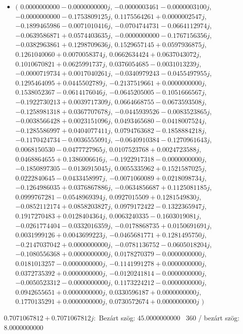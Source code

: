 \documentclass[14pt,a4paper]{article}
\begin{document}
\begin{itemize}
\item
$\big($
$0.0000000000-0.0000000000j$, $-0.0000003461-0.0000003100j$, $-0.0000000000-0.1753809125j$, $0.1175564261+0.0000002547j$, $-0.1899465986-0.0071010416j$, $-0.0704744731-0.0664112974j$, $-0.0639586871+0.0574403635j$, $-0.0000000000-0.1767156356j$, $-0.0382963861+0.1298709636j$, $0.1529657145+0.0597936875j$, $0.1261040060+0.0070058374j$, $0.0662634424+0.0637043072j$, $0.1010670821+0.0625991737j$, $0.0376054685-0.0031013239j$, $-0.0000719734+0.0017040261j$, $-0.0340979243-0.0455497955j$, $0.1295464095+0.0445502789j$, $-0.2137519661+0.0000000000j$, $0.1538052367-0.0614176046j$, $-0.0645205005-0.1051666567j$, $-0.1922730213+0.0039717309j$, $0.0664668755-0.0673593508j$, $-0.1258981318+0.0367707678j$, $-0.0445939526-0.0083523865j$, $-0.0038566428+0.0023151096j$, $0.0493465680-0.0418007524j$, $-0.1285586997+0.0404077411j$, $0.0794763682-0.1858884218j$, $-0.1170424734-0.0036555091j$, $-0.0640910384-0.1270961643j$, $0.0068150530-0.0477727965j$, $0.0107523768+0.0024723588j$, $0.0468864655+0.1386006616j$, $-0.1922917318-0.0000000000j$, $-0.1850897305-0.0136915045j$, $0.0055335962+0.1521587025j$, $0.0222840645-0.0433458997j$, $-0.0071060089+0.0218098734j$, $-0.1264986035+0.0376867886j$, $-0.0634856687+0.1125081185j$, $0.0999767281-0.0548969394j$, $0.0927015509+0.1281549830j$, $-0.0852112174+0.0858203827j$, $0.0979172422-0.1322365947j$, $0.1917270483+0.0128404364j$, $0.0063240335-0.1603019081j$, $-0.0261774404-0.0332016359j$, $-0.0178868735+0.0150691691j$, $0.0031999126+0.0043699223j$, $-0.0465681771+0.1281495750j$, $-0.2147037042+0.0000000000j$, $-0.0781136752-0.0605018204j$, $-0.1080556368+0.0000000000j$, $0.0178270379-0.0000000000j$, $0.0181013257-0.0000000000j$, $-0.1141991278+0.0000000000j$, $0.0372735392+0.0000000000j$, $-0.0120241814-0.0000000000j$, $-0.0050523312-0.0000000000j$, $0.1173224212-0.0000000000j$, $0.0942655651+0.0000000000j$, $0.0330596187+0.0000000000j$, $0.1770135291+0.0000000000j$, $0.0730572674+0.0000000000j$
$\big)$
\end{itemize}
$0.7071067812+0.7071067812j$:\
Bezárt szög: $45.0000000000$ \
360 / bezárt szög: $8.0000000000$\
\end{document}
